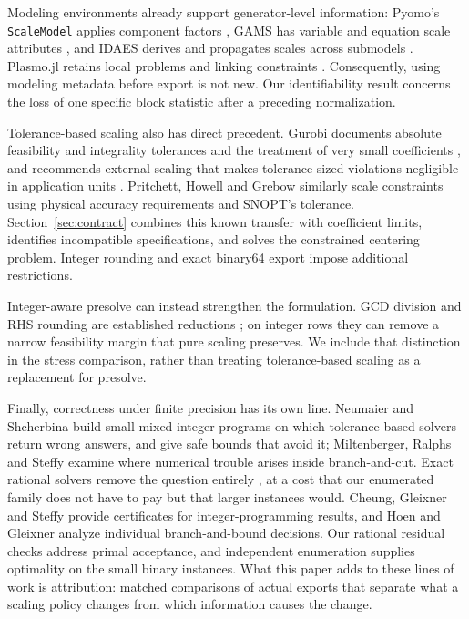 Modeling environments already support generator-level information: Pyomo's
\texttt{ScaleModel} applies component factors \cite{pyomoScaleModel}, GAMS has
variable and equation scale attributes \cite{gamsScaling}, and IDAES derives and
propagates scales across submodels \cite{idaesScaling,idaesCustomScaler}. Plasmo.jl
retains local problems and linking constraints \cite{jalving2022plasmo}. Consequently,
using modeling metadata before export is not new. Our identifiability result concerns
the loss of one specific block statistic after a preceding normalization.

Tolerance-based scaling also has direct precedent. Gurobi documents absolute
feasibility and integrality tolerances and the treatment of very small coefficients
\cite{gurobiScaling}, and recommends external scaling that makes tolerance-sized
violations negligible in application units \cite{gurobiExternalScaling}. Pritchett,
Howell and Grebow \cite{pritchett2017scaling} similarly scale constraints using
physical accuracy requirements and SNOPT's tolerance. Section~\ref{sec:contract}
combines this known transfer with coefficient limits, identifies incompatible
specifications, and solves the constrained centering problem. Integer rounding and
exact binary64 export impose additional restrictions.

Integer-aware presolve can instead strengthen the formulation. GCD division and
RHS rounding are established reductions \cite{achterberg2020presolve}; on integer
rows they can remove a narrow feasibility margin that pure scaling preserves.
We include that distinction in the stress comparison, rather than treating
tolerance-based scaling as a replacement for presolve.

Finally, correctness under finite precision has its own line. Neumaier and Shcherbina
\cite{neumaier2004safe} build small mixed-integer programs on which tolerance-based solvers
return wrong answers, and give safe bounds that avoid it; Miltenberger, Ralphs and Steffy
\cite{miltenberger2018numerics} examine where numerical trouble arises inside branch-and-cut.
Exact rational solvers remove the question entirely \cite{cook2013exact,eifler2022status}, at a
cost that our enumerated family does not have to pay but that larger instances would. Cheung,
Gleixner and Steffy \cite{cheung2017certificates} provide certificates for
integer-programming results, and Hoen and Gleixner \cite{hoen2024correctness} analyze
individual branch-and-bound decisions. Our rational residual checks address primal acceptance,
and independent enumeration supplies optimality on the small binary instances.
What this paper adds to these lines of work is attribution: matched comparisons of actual
exports that separate what a scaling policy changes from which information causes the change.
